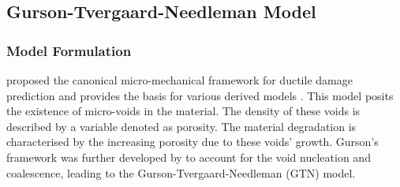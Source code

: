 \documentclass[sn-mathphys,Numbered,draft]{sn-jnl}%
\begin{document}
\subsection{Gurson-Tvergaard-Needleman Model}

\subsubsection{Model Formulation}

 \citet{gurson_continuum_1977} proposed the canonical micro-mechanical framework for ductile damage prediction and provides the basis for various derived models \cite{besson_continuum_2010, bettaieb_numerical_2011, achouri_numerical_2013m cao_models_2017, tekkaya_damage_2020}.
This model posits the existence of micro-voids in the material.
The density of these voids is described by a variable denoted as porosity.
The material degradation is characterised by the increasing porosity due to these voids' growth.
Gurson’s framework was further developed by \citet{tvergaard_analysis_1984} to account for the void nucleation and coalescence, leading to the Gurson-Tvergaard-Needleman (GTN) model.

\end{document}
